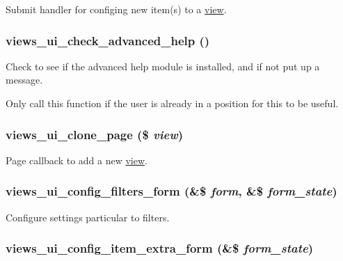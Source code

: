 Submit handler for configing new item(s) to a \hyperlink{classview}{view}. \hypertarget{admin_8inc_def4f03f528e350d8153839789f69335}{
\subsubsection[{views\_\-ui\_\-check\_\-advanced\_\-help}]{\setlength{\rightskip}{0pt plus 5cm}views\_\-ui\_\-check\_\-advanced\_\-help ()}}
\label{admin_8inc_def4f03f528e350d8153839789f69335}


Check to see if the advanced help module is installed, and if not put up a message.

Only call this function if the user is already in a position for this to be useful. \hypertarget{admin_8inc_9578c8af80437c526f0f5e2edce270a2}{
\subsubsection[{views\_\-ui\_\-clone\_\-page}]{\setlength{\rightskip}{0pt plus 5cm}views\_\-ui\_\-clone\_\-page (\$ {\em view})}}
\label{admin_8inc_9578c8af80437c526f0f5e2edce270a2}


Page callback to add a new \hyperlink{classview}{view}. \hypertarget{admin_8inc_94ed7bd014dce1a7f7f728fa6790e3f0}{
\subsubsection[{views\_\-ui\_\-config\_\-filters\_\-form}]{\setlength{\rightskip}{0pt plus 5cm}views\_\-ui\_\-config\_\-filters\_\-form (\&\$ {\em form}, \/  \&\$ {\em form\_\-state})}}
\label{admin_8inc_94ed7bd014dce1a7f7f728fa6790e3f0}


Configure settings particular to filters. \hypertarget{admin_8inc_3394e32b3f8096b6edf8c2fec4906751}{
\subsubsection[{views\_\-ui\_\-config\_\-item\_\-extra\_\-form}]{\setlength{\rightskip}{0pt plus 5cm}views\_\-ui\_\-config\_\-item\_\-extra\_\-form (\&\$ {\em form\_\-state})}}
\label{admin_8inc_3394e32b3f8096b6edf8c2fec4906751}


